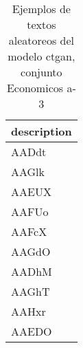 \begin{table}[H]
\centering
\fontsize{8}{14}\selectfont
\caption{Ejemplos de textos aleatoreos del modelo ctgan, conjunto Economicos a-3}
\label{table-sample10-economicos-a-3-ctgan-text}
\begin{tabular}{|m{50em}|}
\hline
\rowcolor[gray]{0.8}
description \\
\hline AADdt \\
\hline AAGlk \\
\hline AAEUX \\
\hline AAFUo \\
\hline AAFcX \\
\hline AAGdO \\
\hline AADhM \\
\hline AAGhT \\
\hline AAHxr \\
\hline AAEDO \\
\hline
\end{tabular}
\end{table}

